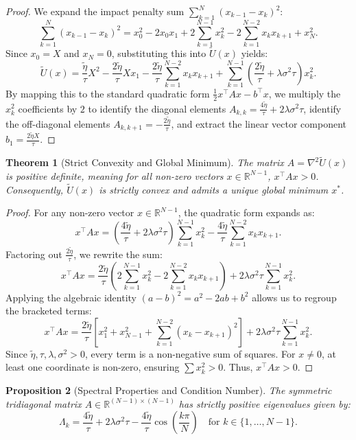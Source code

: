 \documentclass[11pt,a4paper]{article}
\newtheorem{theorem}{Theorem}[section]
\newtheorem{proposition}[theorem]{Proposition}
\begin{document}
\begin{proof}
We expand the impact penalty sum $\sum_{k=1}^{N} (x_{k-1} - x_k)^2$:
\[ \sum_{k=1}^{N} (x_{k-1} - x_k)^2 = x_0^2 - 2x_0 x_1 + 2\sum_{k=1}^{N-1} x_k^2 - 2\sum_{k=1}^{N-2} x_k x_{k+1} + x_N^2. \]
Since $x_0 = X$ and $x_N = 0$, substituting this into $\tilde{U}(x)$ yields:
\[ \tilde{U}(x) = \frac{\tilde{\eta}}{\tau} X^2 - \frac{2\tilde{\eta}}{\tau} X x_1 - \frac{2\tilde{\eta}}{\tau} \sum_{k=1}^{N-2} x_k x_{k+1} + \sum_{k=1}^{N-1} \left( \frac{2\tilde{\eta}}{\tau} + \lambda \sigma^2 \tau \right) x_k^2. \]
By mapping this to the standard quadratic form $\frac{1}{2}x^\top A x - b^\top x$, we multiply the $x_k^2$ coefficients by $2$ to identify the diagonal elements $A_{k,k} = \frac{4\tilde{\eta}}{\tau} + 2\lambda \sigma^2 \tau$, identify the off-diagonal elements $A_{k,k+1} = -\frac{2\tilde{\eta}}{\tau}$, and extract the linear vector component $b_1 = \frac{2\tilde{\eta}X}{\tau}$.
\end{proof}

\begin{theorem}[Strict Convexity and Global Minimum]
The matrix $A = \nabla^2 \tilde{U}(x)$ is positive definite, meaning for all non-zero vectors $x \in \mathbb{R}^{N-1}$, $x^\top A x > 0$. Consequently, $\tilde{U}(x)$ is strictly convex and admits a unique global minimum $x^*$.
\end{theorem}

\begin{proof}
For any non-zero vector $x \in \mathbb{R}^{N-1}$, the quadratic form expands as:
\[ x^\top A x = \left(\frac{4\tilde{\eta}}{\tau} + 2\lambda\sigma^2\tau\right)\sum_{k=1}^{N-1} x_k^2 - \frac{4\tilde{\eta}}{\tau} \sum_{k=1}^{N-2} x_k x_{k+1}. \]
Factoring out $\frac{2\tilde{\eta}}{\tau}$, we rewrite the sum:
\[ x^\top A x = \frac{2\tilde{\eta}}{\tau} \left( 2\sum_{k=1}^{N-1} x_k^2 - 2\sum_{k=1}^{N-2} x_k x_{k+1} \right) + 2\lambda\sigma^2\tau \sum_{k=1}^{N-1} x_k^2. \]
Applying the algebraic identity $(a-b)^2 = a^2 - 2ab + b^2$ allows us to regroup the bracketed terms:
\[ x^\top A x = \frac{2\tilde{\eta}}{\tau} \left[ x_1^2 + x_{N-1}^2 + \sum_{k=1}^{N-2} (x_k - x_{k+1})^2 \right] + 2\lambda\sigma^2\tau \sum_{k=1}^{N-1} x_k^2. \]
Since $\tilde{\eta}, \tau, \lambda, \sigma^2 > 0$, every term is a non-negative sum of squares. For $x \neq 0$, at least one coordinate is non-zero, ensuring $\sum x_k^2 > 0$. Thus, $x^\top A x > 0$.
\end{proof}

\begin{proposition}[Spectral Properties and Condition Number]
The symmetric tridiagonal matrix $A \in \mathbb{R}^{(N-1) \times (N-1)}$ has strictly positive eigenvalues given by:
\[ \Lambda_k = \frac{4\tilde{\eta}}{\tau} + 2\lambda\sigma^2\tau - \frac{4\tilde{\eta}}{\tau} \cos\left(\frac{k\pi}{N}\right) \quad \text{for } k \in \{1, \dots, N-1\}. \]
\end{proposition}
\end{document}
